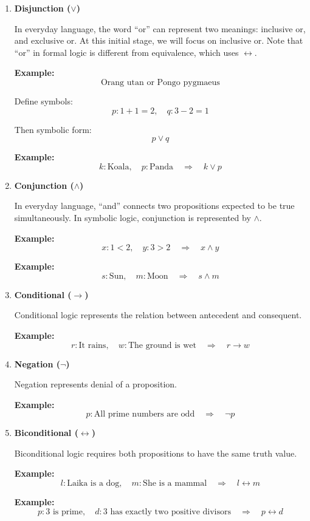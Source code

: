 \documentclass[12pt,a4paper,openany]{article}
\begin{document}
\begin{enumerate}
\item
\textbf{Disjunction (\(\lor\))}

In everyday language, the word ``or'' can represent two meanings:
inclusive or, and exclusive or. At this initial stage, we will focus
on inclusive or. Note that ``or'' in formal logic is different from
equivalence, which uses \(\leftrightarrow\).

\textbf{Example:}
\[
\text{Orang utan or Pongo pygmaeus}
\]

Define symbols:
\[
p: 1 + 1 = 2, \quad q: 3 - 2 = 1
\]

Then symbolic form:
\[
p \lor q
\]

\textbf{Example:}
\[
k: \text{Koala}, \quad p: \text{Panda} \quad \Rightarrow \quad k \lor p
\]

\item
\textbf{Conjunction (\(\land\))}

In everyday language, ``and'' connects two propositions expected to be
true simultaneously. In symbolic logic, conjunction is represented by \(\land\).

\textbf{Example:}
\[
x: 1<2, \quad y: 3>2 \quad \Rightarrow \quad x \land y
\]

\textbf{Example:}
\[
s: \text{Sun}, \quad m: \text{Moon} \quad \Rightarrow \quad s \land m
\]

\item
\textbf{Conditional (\(\rightarrow\))}

Conditional logic represents the relation between antecedent and
consequent.

\textbf{Example:}
\[
r: \text{It rains}, \quad w: \text{The ground is wet} \quad \Rightarrow \quad r \rightarrow w
\]

\item
\textbf{Negation (\(\neg\))}

Negation represents denial of a proposition.

\textbf{Example:}
\[
p: \text{All prime numbers are odd} \quad \Rightarrow \quad \neg p
\]

\item
\textbf{Biconditional (\(\leftrightarrow\))}

Biconditional logic requires both propositions to have the same truth value.

\textbf{Example:}
\[
l: \text{Laika is a dog}, \quad m: \text{She is a mammal} \quad \Rightarrow \quad l \leftrightarrow m
\]

\textbf{Example:}
\[
p: 3 \text{ is prime}, \quad d: 3 \text{ has exactly two positive divisors} \quad \Rightarrow \quad p \leftrightarrow d
\]

\end{enumerate}
\end{document}
